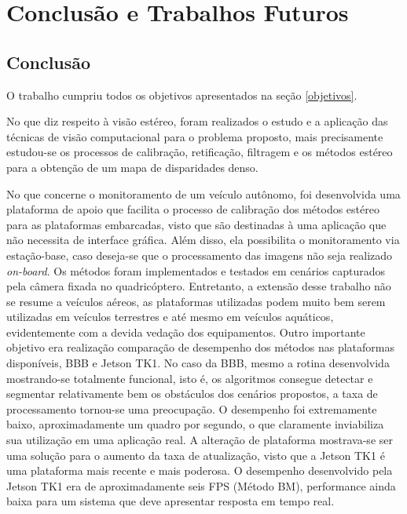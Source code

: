 \chapter{Conclusão e Trabalhos Futuros}
\label{Conclusao}

\section{Conclusão}
O trabalho cumpriu todos os objetivos apresentados na seção \ref{objetivos}. 

No que diz respeito à visão estéreo, foram realizados o estudo e a aplicação das técnicas de visão computacional para o problema proposto, mais precisamente estudou-se os processos de calibração, retificação, filtragem e os métodos estéreo para a obtenção de um mapa de disparidades denso. 

No que concerne o monitoramento de um veículo autônomo, foi desenvolvida uma plataforma de apoio que facilita o processo de calibração dos métodos estéreo para as plataformas embarcadas, visto que são destinadas à uma aplicação que não necessita de interface gráfica. Além disso, ela possibilita o monitoramento via estação-base, caso deseja-se que o processamento das imagens não seja realizado \textit{on-board}. Os métodos foram implementados e testados em cenários capturados pela câmera fixada no quadricóptero. Entretanto, a extensão desse trabalho não se resume a veículos aéreos, as plataformas utilizadas podem muito bem serem utilizadas em veículos terrestres e até mesmo em veículos aquáticos, evidentemente com a devida vedação dos equipamentos. Outro importante objetivo era realização comparação de desempenho dos métodos nas plataformas disponíveis, BBB e Jetson TK1. No caso da BBB, mesmo a rotina desenvolvida mostrando-se totalmente funcional, isto é, os algoritmos consegue detectar e segmentar relativamente bem os obstáculos dos cenários propostos, a taxa de processamento tornou-se uma preocupação. O desempenho foi extremamente baixo, aproximadamente um quadro por segundo, o que claramente inviabiliza sua utilização em uma aplicação real. A alteração de plataforma mostrava-se ser uma solução para o aumento da taxa de atualização, visto que a Jetson TK1 é uma plataforma mais recente e mais poderosa. O desempenho desenvolvido pela Jetson TK1 era de aproximadamente seis FPS (Método BM), performance ainda baixa para um sistema que deve apresentar resposta em tempo real.

